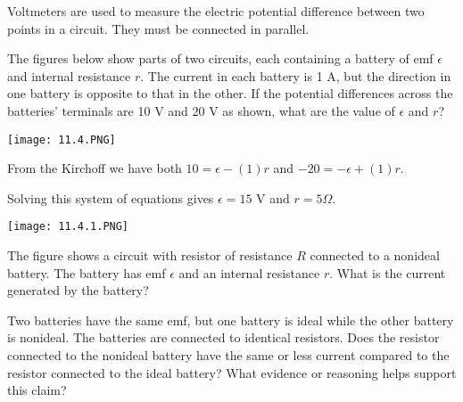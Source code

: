 \documentclass[../em.tex]{subfiles}
\begin{document}
Voltmeters are used to measure the electric potential difference between two points in a circuit. They must be connected in parallel.

\begin{example}
    The figures below show parts of two circuits, each containing a battery of emf $\epsilon$ and internal resistance $r$. The current in each battery is 1 A, but the direction in one battery 
    is opposite to that in the other. If the potential differences across the batteries' terminals are 10 V and 20 V as shown, what are the value of $\epsilon$ and $r$?

    \begin{center}
        \texttt{[image: 11.4.PNG]}
    \end{center}

    From the Kirchoff we have both $10=\epsilon-(1)r$ and $-20=-\epsilon+(1)r$.

    Solving this system of equations gives $\epsilon = 15$ V and $r = 5 \Omega$.   
\end{example}

\ex \begin{center}
    \texttt{[image: 11.4.1.PNG]}
\end{center}
The figure shows a circuit with resistor of resistance $R$ connected to a nonideal battery. The battery has emf $\epsilon$ and an internal resistance $r$. What is the current generated by the battery?

\ex Two batteries have the same emf, but one battery is ideal while the other battery is nonideal. The batteries are connected to identical resistors. Does the resistor connected to the nonideal battery 
have the same or less current compared to the resistor connected to the ideal battery? What evidence or reasoning helps support this claim?
\end{document}
